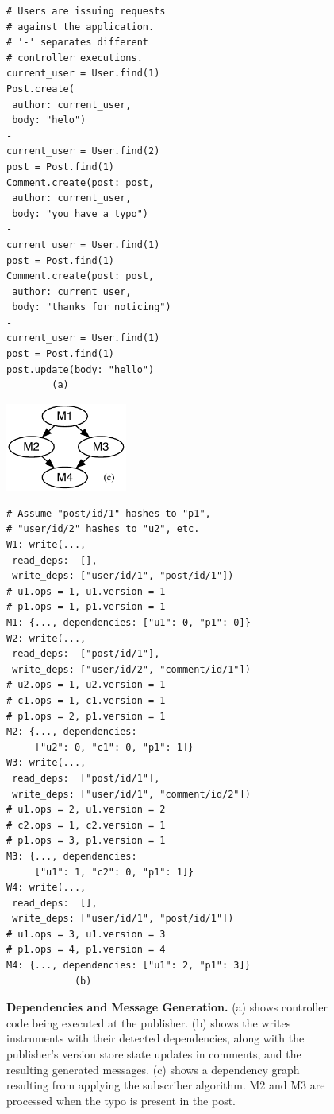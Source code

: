 \begin{figure}
\begin{minipage}{.35\textwidth}
  \footnotesize
\begin{lstlisting}[framexleftmargin=5pt]
# Users are issuing requests
# against the application.
# '-' separates different
# controller executions.
current_user = User.find(1)
Post.create(
 author: current_user,
 body: "helo")
-
current_user = User.find(2)
post = Post.find(1)
Comment.create(post: post,
 author: current_user,
 body: "you have a typo")
-
current_user = User.find(1)
post = Post.find(1)
Comment.create(post: post,
 author: current_user,
 body: "thanks for noticing")
-
current_user = User.find(1)
post = Post.find(1)
post.update(body: "hello")
        (a)
\end{lstlisting}
\hspace{1em}
\includegraphics[width=4cm]{figures/synapse/dep-graph.pdf}
\end{minipage}
\hfill
\begin{minipage}{0.45\textwidth}
  \footnotesize
\begin{lstlisting}[framexleftmargin=5pt]
# Assume "post/id/1" hashes to "p1",
# "user/id/2" hashes to "u2", etc.
W1: write(...,
 read_deps:  [],
 write_deps: ["user/id/1", "post/id/1"])
# u1.ops = 1, u1.version = 1
# p1.ops = 1, p1.version = 1
M1: {..., dependencies: ["u1": 0, "p1": 0]}
W2: write(...,
 read_deps:  ["post/id/1"],
 write_deps: ["user/id/2", "comment/id/1"])
# u2.ops = 1, u2.version = 1
# c1.ops = 1, c1.version = 1
# p1.ops = 2, p1.version = 1
M2: {..., dependencies:
     ["u2": 0, "c1": 0, "p1": 1]}
W3: write(...,
 read_deps:  ["post/id/1"],
 write_deps: ["user/id/1", "comment/id/2"])
# u1.ops = 2, u1.version = 2
# c2.ops = 1, c2.version = 1
# p1.ops = 3, p1.version = 1
M3: {..., dependencies:
     ["u1": 1, "c2": 0, "p1": 1]}
W4: write(...,
 read_deps:  [],
 write_deps: ["user/id/1", "post/id/1"])
# u1.ops = 3, u1.version = 3
# p1.ops = 4, p1.version = 4
M4: {..., dependencies: ["u1": 2, "p1": 3]}
            (b)
\end{lstlisting}
\end{minipage}

\caption{{\bf Dependencies and Message Generation.}
(a) shows controller code being executed at the publisher.
(b) shows the writes \synapse instruments with their detected
  dependencies, along with the publisher's version store state updates
  in comments, and the resulting generated messages.
(c) shows a dependency graph resulting from applying the subscriber algorithm.
M2 and M3 are processed when the typo is present in the post.
}
\label{fig:deps-example}
\end{figure}

